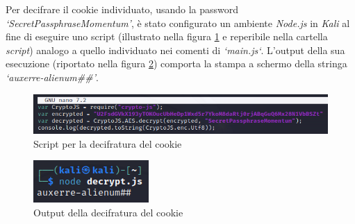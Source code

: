 Per decifrare il cookie individuato, usando la password \emph{`SecretPassphraseMomentum'}, è stato configurato un ambiente \emph{Node.js} in \emph{Kali} al fine di eseguire uno script (illustrato nella figura \ref{fig:decrypt} e reperibile nella cartella \emph{script}) analogo a quello individuato nei comenti di \emph{`main.js`}. L'output della sua esecuzione (riportato nella figura \ref{fig:decrypted}) comporta la stampa a schermo della stringa \emph{`auxerre-alienum\#\#'}.  
\begin{figure}[h]
    \centering
    \includegraphics[scale=0.6]{capitoli/images/decrypt.png}
    \caption{Script per la decifratura del cookie}
    \label{fig:decrypt}
\end{figure}
\begin{figure}[h]
    \centering
    \includegraphics[scale=1]{capitoli/images/decrypted.png}
    \caption{Output della decifratura del cookie}
    \label{fig:decrypted}
\end{figure}
